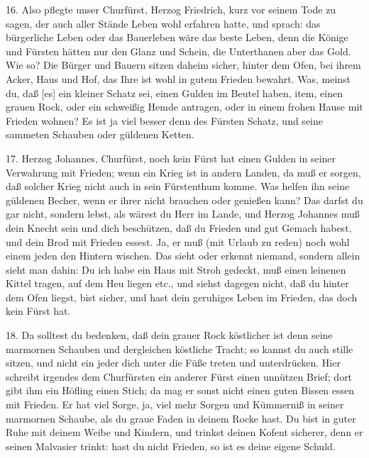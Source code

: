 16. Also pflegte unser Churfürst, Herzog Friedrich, kurz vor seinem Tode zu sagen, der auch aller Stände Leben wohl erfahren hatte, und sprach: das bürgerliche Leben oder das Bauerleben wäre das beste Leben, denn die Könige und Fürsten hätten nur den Glanz und Schein, die Unterthanen aber das Gold. Wie so? Die Bürger und Bauern sitzen daheim sicher, hinter dem Ofen, bei ihrem Acker, Haus und Hof, das Ihre ist wohl in gutem Frieden bewahrt. Was, meinst du, daß [es] ein kleiner Schatz sei, einen Gulden im Beutel haben, item, einen grauen Rock, oder ein schweißig Hemde antragen, oder in einem frohen Hause mit Frieden wohnen? Es ist ja viel besser denn des Fürsten Schatz, und seine sammeten Schauben oder güldenen Ketten.

17. Herzog Johannes, Churfürst, noch kein Fürst hat einen Gulden in seiner Verwahrung mit Frieden; wenn ein Krieg ist in andern Landen, da muß er sorgen, daß solcher Krieg nicht auch in sein Fürstenthum komme. Was helfen ihn seine güldenen Becher, wenn er ihrer nicht brauchen oder genießen kann? Das darfst du gar nicht, sondern lebst, als wärest du Herr im Lande, und Herzog Johannes muß dein Knecht sein und dich beschützen, daß du Frieden und gut Gemach habest, und dein Brod mit Frieden essest. Ja, er muß (mit Urlaub zu reden) noch wohl einem jeden den Hintern wischen. Das sieht oder erkennt niemand, sondern allein sieht man dahin: Du ich habe ein Haus mit Stroh gedeckt, muß einen leinenen Kittel tragen, auf dem Heu liegen etc., und siehst dagegen nicht, daß du hinter dem Ofen liegst, bist sicher, und hast dein geruhiges Leben im Frieden, das doch kein Fürst hat.

18. Da solltest du bedenken, daß dein grauer Rock köstlicher ist denn seine marmornen Schauben und dergleichen köstliche Tracht; so kannst du auch stille sitzen, und nicht ein jeder dich unter die Füße treten und unterdrücken. Hier schreibt irgendes dem Churfürsten ein anderer Fürst einen unnützen Brief; dort gibt ihm ein Höfling einen Stich; da mag er sonst nicht einen guten Bissen essen mit Frieden. Er hat viel Sorge, ja, viel mehr Sorgen und Kümmerniß in seiner marmornen Schaube, als du graue Faden in deinem Rocke hast. Du bist in guter Ruhe mit deinem Weibe und Kindern, und trinkst deinen Kofent sicherer, denn er seinen Malvasier trinkt: hast du nicht Frieden, so ist es deine eigene Schuld.


